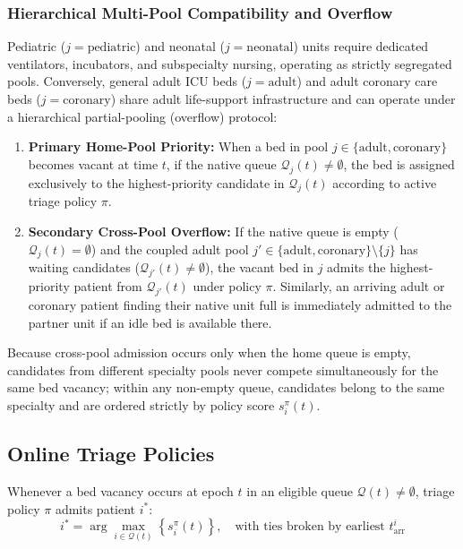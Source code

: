 \documentclass[final,5p,times,twocolumn]{elsarticle}
\begin{document}
\subsubsection{Hierarchical Multi-Pool Compatibility and Overflow}
\label{sec:overflow_rules}
Pediatric ($j = \text{pediatric}$) and neonatal ($j = \text{neonatal}$) units require dedicated ventilators, incubators, and subspecialty nursing, operating as strictly segregated pools. Conversely, general adult ICU beds ($j = \text{adult}$) and adult coronary care beds ($j = \text{coronary}$) share adult life-support infrastructure and can operate under a hierarchical partial-pooling (overflow) protocol:
\begin{enumerate}[(1)]
    \item \textbf{Primary Home-Pool Priority:} When a bed in pool $j \in \{\text{adult}, \text{coronary}\}$ becomes vacant at time $t$, if the native queue $\mathcal{Q}_j(t) \ne \emptyset$, the bed is assigned exclusively to the highest-priority candidate in $\mathcal{Q}_j(t)$ according to active triage policy $\pi$.
    \item \textbf{Secondary Cross-Pool Overflow:} If the native queue is empty ($\mathcal{Q}_j(t) = \emptyset$) and the coupled adult pool $j' \in \{\text{adult}, \text{coronary}\} \setminus \{j\}$ has waiting candidates ($\mathcal{Q}_{j'}(t) \ne \emptyset$), the vacant bed in $j$ admits the highest-priority patient from $\mathcal{Q}_{j'}(t)$ under policy $\pi$. Similarly, an arriving adult or coronary patient finding their native unit full is immediately admitted to the partner unit if an idle bed is available there.
\end{enumerate}
Because cross-pool admission occurs only when the home queue is empty, candidates from different specialty pools never compete simultaneously for the same bed vacancy; within any non-empty queue, candidates belong to the same specialty and are ordered strictly by policy score $s_i^\pi(t)$.

\subsection{Online Triage Policies}

Whenever a bed vacancy occurs at epoch $t$ in an eligible queue $\mathcal{Q}(t) \ne \emptyset$, triage policy $\pi$ admits patient $i^*$:
\begin{equation}
    i^* = \arg\max_{i \in \mathcal{Q}(t)} \left\{ s_i^{\pi}(t) \right\}, \quad \text{with ties broken by earliest } t_{\text{arr}}^i
    \label{eq:selection_rule}
\end{equation}
\end{document}
